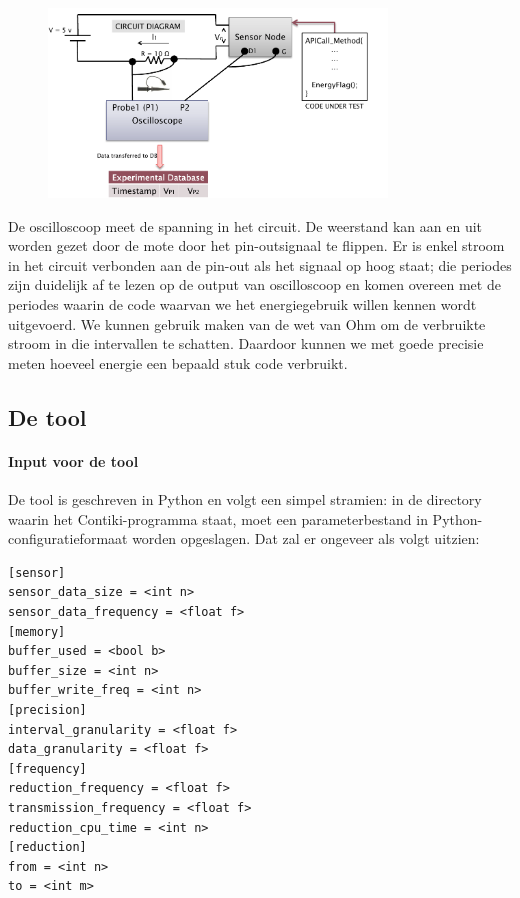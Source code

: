 \documentclass{article}
\begin{document}
\begin{figure}[h]
\centering
\includegraphics[width=9cm]{meetopstelling}
\label{fig:meetopstelling}
\end{figure}

De oscilloscoop meet de spanning in het circuit. De weerstand kan aan en uit
worden gezet door de mote door het pin-outsignaal te flippen. Er is enkel stroom
in het circuit verbonden aan de pin-out als het signaal op hoog staat; die
periodes zijn duidelijk af te lezen op de output van oscilloscoop en komen
overeen met de periodes waarin de code waarvan we het energiegebruik willen
kennen wordt uitgevoerd. We kunnen gebruik maken van de wet van Ohm om de
verbruikte stroom in die intervallen te schatten. Daardoor kunnen we met goede
precisie meten hoeveel energie een bepaald stuk code verbruikt.

\subsection{De tool}

\paragraph{Input voor de tool}
De tool is geschreven in Python en volgt een simpel stramien: in de directory
waarin het Contiki-programma staat, moet een parameterbestand in
Python-configuratieformaat worden opgeslagen. Dat zal er ongeveer als volgt
uitzien:

\begin{verbatim}
[sensor]
sensor_data_size = <int n>
sensor_data_frequency = <float f>
[memory]
buffer_used = <bool b>
buffer_size = <int n>
buffer_write_freq = <int n>
[precision]
interval_granularity = <float f>
data_granularity = <float f>
[frequency]
reduction_frequency = <float f>
transmission_frequency = <float f>
reduction_cpu_time = <int n>
[reduction]
from = <int n>
to = <int m>
\end{verbatim}
\end{document}
